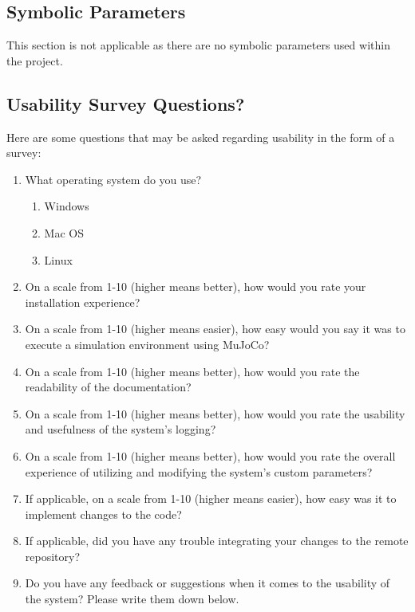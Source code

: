 \documentclass[12pt, titlepage]{article}
\begin{document}
\subsection{Symbolic Parameters}


This section is not applicable as there are no symbolic parameters used within the project.


\subsection{Usability Survey Questions?}


Here are some questions that may be asked regarding usability in the form of a survey:
\begin{enumerate}
  \item What operating system do you use?
  \begin{enumerate}
    \item Windows
    \item Mac OS
    \item Linux
  \end{enumerate}
  \item On a scale from 1-10 (higher means better), how would you rate your installation experience?
  \item On a scale from 1-10 (higher means easier), how easy would you say it was to execute a simulation environment using MuJoCo?
  \item On a scale from 1-10 (higher means better), how would you rate the readability of the documentation?
  \item On a scale from 1-10 (higher means better), how would you rate the usability and usefulness of the system's logging?
  \item On a scale from 1-10 (higher means better), how would you rate the overall experience of utilizing and modifying the system's custom parameters?
  \item If applicable, on a scale from 1-10 (higher means easier), how easy was it to implement changes to the code?
  \item If applicable, did you have any trouble integrating your changes to the remote repository?
  \item Do you have any feedback or suggestions when it comes to the usability of the system? Please write them down below.
\end{enumerate}
\end{document}
